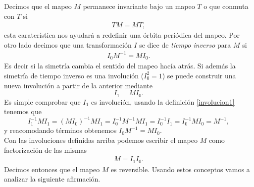 Decimos que el mapeo $M$ permanece invariante bajo un mapeo $T$ o que conmuta con $T$ si 
\begin{eqnarray}
TM = MT,
\label{conmuta}
\end{eqnarray}
esta carater\'istica nos ayudar\'a a redefinir una \'orbita peri\'odica del mapeo. Por otro lado decimos que una transformaci\'on $I$ se dice de \textit{tiempo inverso} para $M$ si 
\begin{eqnarray}
I_{0}M^{-1} = MI_{0}.
\label{involucion1}
\end{eqnarray}
Es decir si la simetr\'ia cambia el sentido del mapeo hac\'ia atr\'as. Si adem\'as la simetr\'ia de tiempo inverso es una involuci\'on ($I_{0}^{2}=1$) se puede construir una nueva involuci\'on a partir de la anterior mediante 
\begin{equation}
I_{1} = MI_{0}.
\label{involucion2}
\end{equation}
Es simple comprobar que $I_{1}$ es involuci\'on, usando la definici\'on \ref{involucion1} tenemos que 
\begin{equation*}
I_{1}^{-1}MI_{1} = (MI_{0})^{-1}MI_{1} = I_{0}^{-1}M^{-1}MI_{1} = I_{0}^{-1}I_{1} = I^{-1}_{0}MI_{0}=M^{-1},
\end{equation*}
y reacomodando t\'erminos obtenemos $I_{0}M^{-1}= MI_{0}$.\\

 
Con las involuciones definidas arriba podemos escribir el mapeo $M$ como factorizaci\'on de las mismas \cite{Devaney3}
\begin{eqnarray}
M = I_{1}I_{0}.
\end{eqnarray}
Decimos entonces que el mapeo $M$ es reversible. Usando estos conceptos vamos a analizar la siguiente afirmaci\'on. \\

